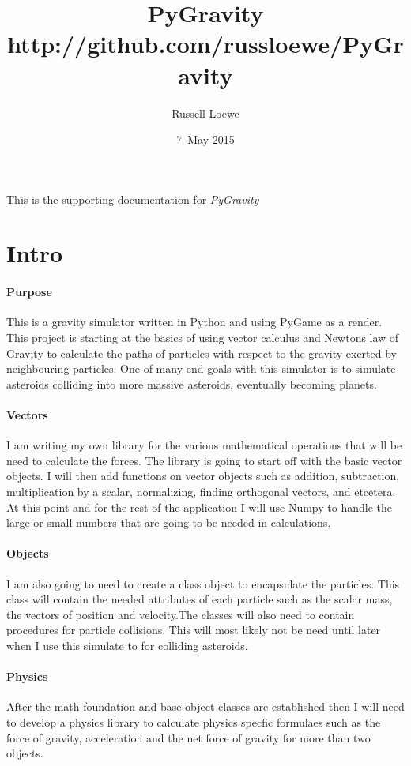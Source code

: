 \documentclass[15pt]{report}
\title{PyGravity \\
		\small http://github.com/russloewe/PyGravity}
\author{Russell Loewe}
\date{7~May 2015}
\begin{document}
\maketitle

\indent
This is the supporting documentation for
\textit{PyGravity} 

\tableofcontents

\newpage



\section{Intro}
\indent \paragraph{Purpose} This is a gravity simulator written in Python and using PyGame as a render. This project is starting at the basics of using vector calculus and Newtons law of Gravity to calculate the paths of particles with respect to the gravity exerted by neighbouring particles. One of many end goals with this simulator is to simulate asteroids colliding into more massive asteroids, eventually becoming planets.
\indent \paragraph{Vectors}I am writing my own library for  the various mathematical operations that will be need to calculate the forces. The library is going to start off with the basic vector objects. I will then add functions on vector objects such as addition, subtraction, multiplication by a scalar, normalizing, finding orthogonal vectors, and etcetera. At this point and for the rest of the application I will use Numpy to handle the large or small numbers that are going to be needed in calculations.
\indent \paragraph{Objects} I am also going to need to create a class object to encapsulate the particles. This class will contain the needed attributes of each particle such as the scalar mass, the vectors of position and velocity.The classes will also need to contain procedures for particle collisions. This will most likely not be need until later when I use this simulate to for colliding asteroids.
\indent \paragraph{Physics} After the math foundation and base object classes are established then I will need to develop a physics library to calculate physics specfic formulaes such as the force of gravity, acceleration and the net force of gravity for more than two objects.
\end{document}
